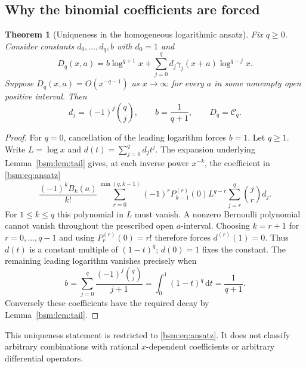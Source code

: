 \documentclass[11pt,letterpaper]{article}
\numberwithin{equation}{section}
\newtheorem{theorem}{Theorem}[section]
\theoremstyle{definition}\newtheorem{definition}[theorem]{Definition}
\theoremstyle{remark}\newtheorem{remark}[theorem]{Remark}
\newcommand{\dd}{\,\mathrm{d}}
\newcommand{\Ccal}{\mathcal C}
\begin{document}
\subsection{Why the binomial coefficients are forced}

\begin{theorem}[Uniqueness in the homogeneous logarithmic ansatz]\label{bsm:thm:unique}
Fix $q\ge0$. Consider constants $d_0,\ldots,d_q,b$ with $d_0=1$ and
\begin{equation}\label{bsm:eq:ansatz}
 D_q(x,a)=b\log^{q+1}x+
               \sum_{j=0}^q d_j\gamma_j(x+a)\log^{q-j}x.
\end{equation}
Suppose $D_q(x,a)=O(x^{-q-1})$ as $x\to\infty$ for every $a$ in some
nonempty open positive interval. Then
\begin{equation}\label{bsm:eq:unique-coeff}
 d_j=(-1)^j\binom qj,
 \qquad b=\frac1{q+1},
 \qquad D_q=\Ccal_q.
\end{equation}
\end{theorem}

\begin{proof}
For $q=0$, cancellation of the leading logarithm forces $b=1$.
Let $q\ge1$. Write $L=\log x$ and $d(t)=\sum_{j=0}^q d_jt^j$.
The expansion underlying Lemma~\ref{bsm:lem:tail} gives, at each inverse
power $x^{-k}$, the coefficient in \eqref{bsm:eq:ansatz}
\[
 \frac{(-1)^kB_k(a)}{k!}
 \sum_{r=0}^{\min(q,k-1)}(-1)^rP_{k-1}^{(r)}(0)L^{q-r}
                  \sum_{j=r}^{q}\binom jr d_j.
\]
For $1\le k\le q$ this polynomial in $L$ must vanish. A nonzero
Bernoulli polynomial cannot vanish throughout the prescribed open
$a$-interval. Choosing $k=r+1$ for $r=0,\ldots,q-1$ and using
$P_r^{(r)}(0)=r!$ therefore forces $d^{(r)}(1)=0$.
Thus $d(t)$ is a constant multiple of $(1-t)^q$; $d(0)=1$ fixes the
constant. The remaining leading logarithm vanishes precisely when
\[
 b=\sum_{j=0}^q\frac{(-1)^j\binom qj}{j+1}
   =\int_0^1(1-t)^q\dd t=\frac1{q+1}.
\]
Conversely these coefficients have the required decay by
Lemma~\ref{bsm:lem:tail}.
\end{proof}

This uniqueness statement is restricted to \eqref{bsm:eq:ansatz}. It does
not classify arbitrary combinations with rational $x$-dependent
coefficients or arbitrary differential operators.
\end{document}
